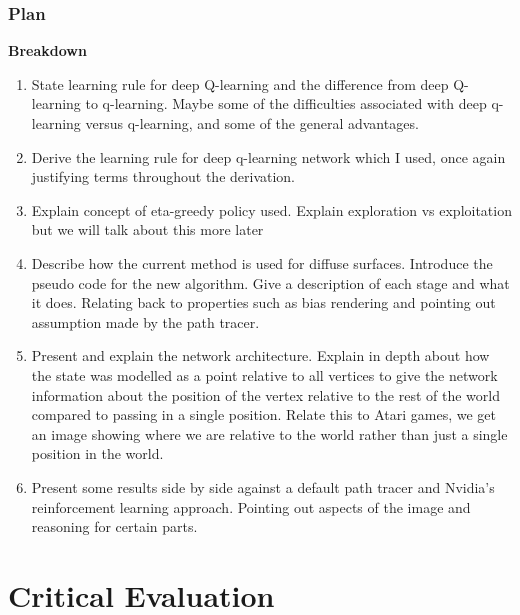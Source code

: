 \documentclass[ %
                    author={Callum Pearce},
                supervisor={Dr. Neill Campbell},
                    degree={MEng},
                     title={How effective are Temporal difference learning methods for reducing the number of zero contribution light paths while still accurately approximating Global Illumination in Path tracing?},
                  subtitle={},
                      type={research},
                      year={2019} ]{dissertation}
\begin{document}
\subsection{Plan}


\textbf{Breakdown}
\begin{enumerate}

\item State learning rule for deep Q-learning and the difference from deep Q-learning to q-learning. Maybe some of the difficulties associated with deep q-learning versus q-learning, and some of the general advantages. 

\item Derive the learning rule for deep q-learning network which I used, once again justifying terms throughout the derivation.

\item Explain concept of eta-greedy policy used. Explain exploration vs exploitation but we will talk about this more later

\item Describe how the current method is used for diffuse surfaces. Introduce the pseudo code for the new algorithm. Give a description of each stage and what it does. Relating back to properties such as bias rendering and pointing out assumption made by the path tracer.

\item Present and explain the network architecture. Explain in depth about how the state was modelled as a point relative to all vertices to give the network information about the position of the vertex relative to the rest of the world compared to passing in a single position. Relate this to Atari games, we get an image showing where we are relative to the world rather than just a single position in the world.

\item Present some results side by side against a default path tracer and Nvidia's reinforcement learning approach. Pointing out aspects of the image and reasoning for certain parts.

\end{enumerate}


\chapter{Critical Evaluation}
\label{chap:evaluation}
\end{document}
